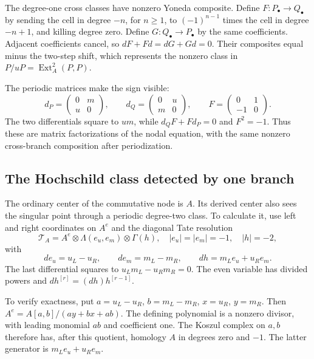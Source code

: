 The degree-one cross classes have nonzero Yoneda composite.
Define $F:P_\bullet\to Q_\bullet$ by sending the cell in
degree $-n$, for $n\geq1$, to $(-1)^{n-1}$ times the cell
in degree $-n+1$, and killing degree zero.
Define $G:Q_\bullet\to P_\bullet$ by the same coefficients.
Adjacent coefficients cancel, so $dF+Fd=dG+Gd=0$.
Their composites equal minus the two-step shift, which represents
the nonzero class in $P/uP=\operatorname{Ext}^2_A(P,P)$.

The periodic matrices make the sign visible:
\begin{equation}\label{cyrec:eq:node-matrix-factorizations}
 d_P=\begin{pmatrix}0&m\\u&0\end{pmatrix},\qquad
 d_Q=\begin{pmatrix}0&u\\m&0\end{pmatrix},\qquad
 F=\begin{pmatrix}0&1\\-1&0\end{pmatrix}.
\end{equation}
The two differentials square to $um$, while
$d_QF+Fd_P=0$ and $F^2=-1$.
Thus these are matrix factorizations of the nodal equation,
with the same nonzero cross-branch composition after
periodization.

\subsection{The Hochschild class detected by one branch}

The ordinary center of the commutative node is $A$.
Its derived center also sees the singular point through a
periodic degree-two class. To calculate it, use left and right
coordinates on $A^e$ and the diagonal Tate resolution
\begin{equation}\label{cyrec:eq:node-diagonal}
 \mathcal T_A=A^e\otimes\Lambda(e_u,e_m)\otimes\Gamma(h),
 \quad |e_u|=|e_m|=-1,\quad |h|=-2,
\end{equation}
with
\[
 de_u=u_L-u_R,\qquad de_m=m_L-m_R,\qquad
 dh=m_Le_u+u_Re_m.
\]
The last differential squares to $u_Lm_L-u_Rm_R=0$.
The even variable has divided powers and
$dh^{[r]}=(dh)h^{[r-1]}$.

To verify exactness, put $a=u_L-u_R$, $b=m_L-m_R$,
$x=u_R$, $y=m_R$.
Then $A^e=A[a,b]/(ay+bx+ab)$.
The defining polynomial is a nonzero divisor, with leading
monomial $ab$ and coefficient one. The Koszul complex on $a,b$
therefore has, after this quotient, homology $A$ in degrees
zero and $-1$. The latter generator is $m_Le_u+u_Re_m$.

